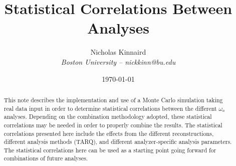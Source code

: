 \documentclass[12pt,letterpaper]{article}
\title{Statistical Correlations Between \Rone \wa Analyses}
\author{Nicholas Kinnaird \\ \small{\textit{Boston University -- nickkinn@bu.edu}}}
\date{\today}
\begin{document}
\maketitle

\begin{abstract}
	This note describes the implementation and use of a Monte Carlo simulation taking real data input in order to determine statistical correlations between the different \Rone $\omega_{a}$ analyses. Depending on the combination methodology adopted, these statistical correlations may be needed in order to properly combine the results. The statistical correlations presented here include the effects from the different reconstructions, different analysis methods (TARQ), and different analyzer-specific analysis parameters. The statistical correlations here can be used as a starting point going forward for combinations of future \wa analyses.
\end{abstract}

\tableofcontents







% 


{}
\printbibliography

\end{document}
